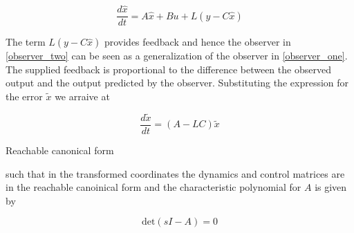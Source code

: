 \begin{equation}
\frac{d \hat{x}}{dt} = A\hat{x} + Bu + L(y- C \hat{x})
\label{observer_two}   
\end{equation}

The term $L(y- C \hat{x})$ provides feedback and hence the observer in \ref{observer_two} can be seen as a generalization of the observer in \ref{observer_one}. The supplied feedback is proportional to the difference between the observed output and the output predicted by the observer. Substituting the expression for the error $\tilde{x}$ we arraive at

 \begin{equation}
\frac{d\tilde{x}}{dt} = (A-LC)\tilde{x} 
\label{observer_two}   
\end{equation}  

\begin{framed}
\theoremstyle{theorem}
\begin{theorem}{Reachable canonical form}


such that in the transformed coordinates  the dynamics and control matrices are in the reachable 
canoinical form and the characteristic polynomial for $A$ is given by

\begin{equation}
\text{det}(sI-A) = 0 \nonumber
\end{equation}

\end{theorem}
\end{framed}


